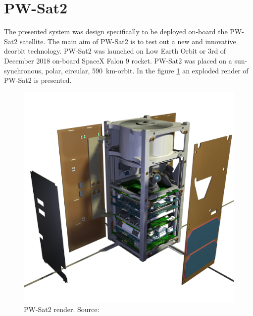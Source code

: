 \section{PW-Sat2}
The presented system was design specifically to be deployed on-board the PW-Sat2 satellite.  The main aim of PW-Sat2 is to test out a new and innovative deorbit technology. PW-Sat2 was launched on Low Earth Orbit or 3rd of December 2018 on-board SpaceX Falon 9 rocket. PW-Sat2 was placed on a sun-synchronous, polar, circular, \SI{590}{\kilo\meter}-orbit.
In the figure \ref{PW-Sat_render_01} an exploded render of PW-Sat2 is presented.
\begin{figure}
    \centering
    \includegraphics[width=0.65\paperwidth]{img/1/PW-Sat2_render_01.png}
    \caption{PW-Sat2 render. Source: \cite{PW_sat2_photo}}
    \label{PW-Sat_render_01}
\end{figure}


